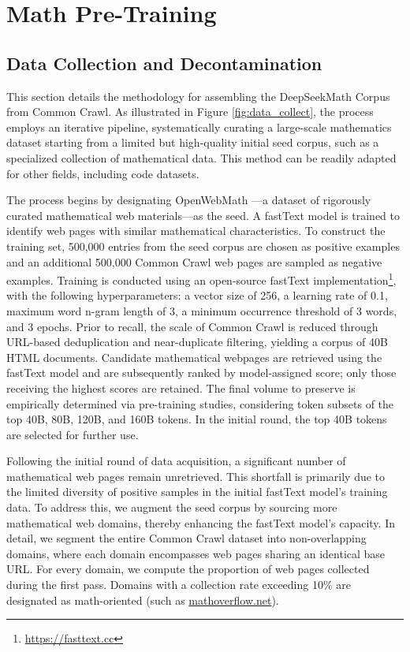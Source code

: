\section{Math Pre-Training}

\subsection{Data Collection and Decontamination} This section details the methodology for assembling the DeepSeekMath Corpus from Common Crawl. As illustrated in Figure \ref{fig:data_collect}, the process employs an iterative pipeline, systematically curating a large-scale mathematics dataset starting from a limited but high-quality initial seed corpus, such as a specialized collection of mathematical data. This method can be readily adapted for other fields, including code datasets.

The process begins by designating OpenWebMath \citep{openwebmath}—a dataset of rigorously curated mathematical web materials—as the seed. A fastText model \citep{joulin2016fasttext} is trained to identify web pages with similar mathematical characteristics. To construct the training set, 500,000 entries from the seed corpus are chosen as positive examples and an additional 500,000 Common Crawl web pages are sampled as negative examples. Training is conducted using an open-source fastText implementation\footnote{\url{https://fasttext.cc}}, with the following hyperparameters: a vector size of 256, a learning rate of 0.1, maximum word n-gram length of 3, a minimum occurrence threshold of 3 words, and 3 epochs. Prior to recall, the scale of Common Crawl is reduced through URL-based deduplication and near-duplicate filtering, yielding a corpus of 40B HTML documents. Candidate mathematical webpages are retrieved using the fastText model and are subsequently ranked by model-assigned score; only those receiving the highest scores are retained. The final volume to preserve is empirically determined via pre-training studies, considering token subsets of the top 40B, 80B, 120B, and 160B tokens. In the initial round, the top 40B tokens are selected for further use.

Following the initial round of data acquisition, a significant number of mathematical web pages remain unretrieved. This shortfall is primarily due to the limited diversity of positive samples in the initial fastText model’s training data. To address this, we augment the seed corpus by sourcing more mathematical web domains, thereby enhancing the fastText model’s capacity. In detail, we segment the entire Common Crawl dataset into non-overlapping domains, where each domain encompasses web pages sharing an identical base URL. For every domain, we compute the proportion of web pages collected during the first pass. Domains with a collection rate exceeding 10\% are designated as math-oriented (such as \url{mathoverflow.net}).

